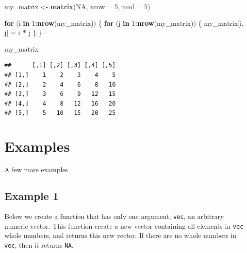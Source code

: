 \documentclass[
]{book}
\newenvironment{Shaded}{\begin{snugshade}}{\end{snugshade}}
\newcommand{\ControlFlowTok}[1]{\textcolor[rgb]{0.13,0.29,0.53}{\textbf{#1}}}
\newcommand{\DataTypeTok}[1]{\textcolor[rgb]{0.13,0.29,0.53}{#1}}
\newcommand{\DecValTok}[1]{\textcolor[rgb]{0.00,0.00,0.81}{#1}}
\newcommand{\KeywordTok}[1]{\textcolor[rgb]{0.13,0.29,0.53}{\textbf{#1}}}
\newcommand{\NormalTok}[1]{#1}
\newcommand{\OperatorTok}[1]{\textcolor[rgb]{0.81,0.36,0.00}{\textbf{#1}}}
\newcommand{\OtherTok}[1]{\textcolor[rgb]{0.56,0.35,0.01}{#1}}
\newcommand{\StringTok}[1]{\textcolor[rgb]{0.31,0.60,0.02}{#1}}
\begin{document}
\begin{Shaded}
\begin{Highlighting}[]
\NormalTok{my_matrix <-}\StringTok{ }\KeywordTok{matrix}\NormalTok{(}\OtherTok{NA}\NormalTok{,}
    \DataTypeTok{nrow =} \DecValTok{5}\NormalTok{, }\DataTypeTok{ncol =} \DecValTok{5}\NormalTok{)}

\ControlFlowTok{for}\NormalTok{ (i }\ControlFlowTok{in} \DecValTok{1}\OperatorTok{:}\KeywordTok{nrow}\NormalTok{(my_matrix)) \{}
    \ControlFlowTok{for}\NormalTok{ (j }\ControlFlowTok{in} \DecValTok{1}\OperatorTok{:}\KeywordTok{nrow}\NormalTok{(my_matrix)) \{}
\NormalTok{        my_matrix[i,}
\NormalTok{            j] =}\StringTok{ }\NormalTok{i }\OperatorTok{*}
\StringTok{            }\NormalTok{j}
\NormalTok{    \}}
\NormalTok{\}}

\NormalTok{my_matrix}
\end{Highlighting}
\end{Shaded}

\begin{verbatim}
##      [,1] [,2] [,3] [,4] [,5]
## [1,]    1    2    3    4    5
## [2,]    2    4    6    8   10
## [3,]    3    6    9   12   15
## [4,]    4    8   12   16   20
## [5,]    5   10   15   20   25
\end{verbatim}

\hypertarget{examples-1}{%
\section{Examples}\label{examples-1}}

A few more examples.

\hypertarget{example-1}{%
\subsection{Example 1}\label{example-1}}

Below we create a function that has only one argument, \texttt{vec}, an arbitrary numeric vector. This function create a new vector containing all elements in \texttt{vec} whole numbers, and returns this new vector. If there are no whole numbers in \texttt{vec}, then it returns \texttt{NA}.
\end{document}
